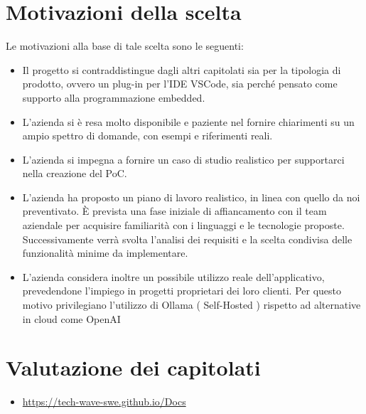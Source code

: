 \documentclass{TWDocumentNoVersion}
\begin{document}
    \section*{Motivazioni della scelta}
    {Le motivazioni alla base di tale scelta sono le seguenti:}
    \begin{itemize}
        \item {Il progetto si contraddistingue dagli altri capitolati sia per la tipologia di prodotto, ovvero un plug-in per l'IDE VSCode, sia perché pensato come supporto alla programmazione embedded.}
        \item{L'azienda si è resa molto disponibile e paziente nel fornire chiarimenti su un ampio spettro di domande, con esempi e riferimenti reali.}
        \item{L'azienda si impegna a fornire un caso di studio realistico per supportarci nella creazione del PoC.}
        \item{L'azienda ha proposto un piano di lavoro realistico, in linea con quello da noi preventivato. È prevista una fase iniziale di affiancamento con il team aziendale per acquisire familiarità con i linguaggi e le tecnologie proposte. Successivamente verrà svolta l'analisi dei requisiti e la scelta condivisa delle funzionalità minime da implementare.}
        \item{L'azienda considera inoltre un possibile utilizzo reale dell'applicativo, prevedendone l'impiego in progetti proprietari dei loro clienti. Per questo motivo privilegiano l'utilizzo di Ollama ( Self-Hosted ) rispetto ad alternative in cloud come OpenAI}
    \end{itemize}

    \section*{Valutazione dei capitolati}
    \begin{itemize}
        \item \href{https://tech-wave-swe.github.io/Docs}{https://tech-wave-swe.github.io/Docs}
    \end{itemize}
\end{document}
